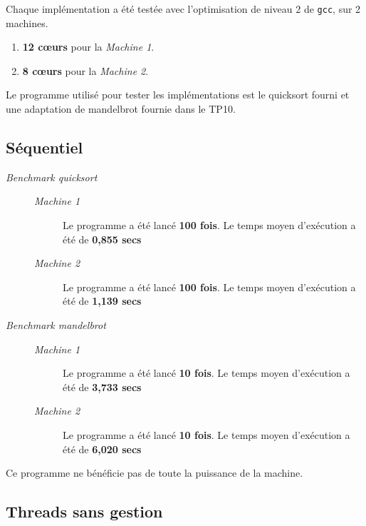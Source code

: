 \documentclass[a4paper]{article}
\def\coeur{c\oe{}ur}
\def\mone{\textit{Machine 1}} %
\def\mtwo{\textit{Machine 2}} %
\def\bone{\textit{Benchmark quicksort}}
\def\btwo{\textit{Benchmark mandelbrot}}
\begin{document}
Chaque implémentation a été testée avec l'optimisation de niveau 2
de \texttt{gcc}, sur 2 machines.

\begin{enumerate}
  \item \textbf{12 \coeur{}s} pour la \mone.
  \item \textbf{8 \coeur{}s} pour la \mtwo.
\end{enumerate}

Le programme utilisé pour tester les implémentations est le quicksort fourni
et une adaptation de mandelbrot fournie dans le TP10.

\subsection{Séquentiel}\label{stats:seq}
\begin{description}
  \item[\bone] \hspace{1em}
        \begin{description}
          \item[\mone] Le programme a été lancé \textbf{100 fois}.
                Le temps moyen d'exécution a été de \textbf{0,855 secs}
          \item[\mtwo] Le programme a été lancé \textbf{100 fois}.
                Le temps moyen d'exécution a été de \textbf{1,139 secs}
        \end{description}

  \item[\btwo] \hspace{1em}
        \begin{description}
          \item[\mone] Le programme a été lancé \textbf{10 fois}.
                Le temps moyen d'exécution a été de \textbf{3,733 secs}
          \item[\mtwo] Le programme a été lancé \textbf{10 fois}.
                Le temps moyen d'exécution a été de \textbf{6,020 secs}
        \end{description}
\end{description}


Ce programme ne bénéficie pas de toute la puissance de la machine.

\subsection{Threads sans gestion}\label{stats:th_ges}
\end{document}
